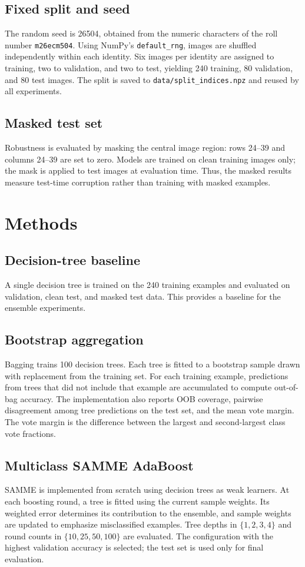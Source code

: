 \documentclass[10pt,twocolumn,letterpaper]{article}
\begin{document}
\subsection{Fixed split and seed}
The random seed is 26504, obtained from the numeric characters of the roll number \texttt{m26ecm504}. Using NumPy's \texttt{default\_rng}, images are shuffled independently within each identity. Six images per identity are assigned to training, two to validation, and two to test, yielding 240 training, 80 validation, and 80 test images. The split is saved to \texttt{data/split\_indices.npz} and reused by all experiments.

\subsection{Masked test set}
Robustness is evaluated by masking the central image region: rows 24--39 and columns 24--39 are set to zero. Models are trained on clean training images only; the mask is applied to test images at evaluation time. Thus, the masked results measure test-time corruption rather than training with masked examples.

\section{Methods}
\subsection{Decision-tree baseline}
A single decision tree is trained on the 240 training examples and evaluated on validation, clean test, and masked test data. This provides a baseline for the ensemble experiments.

\subsection{Bootstrap aggregation}
Bagging trains 100 decision trees. Each tree is fitted to a bootstrap sample drawn with replacement from the training set. For each training example, predictions from trees that did not include that example are accumulated to compute out-of-bag accuracy. The implementation also reports OOB coverage, pairwise disagreement among tree predictions on the test set, and the mean vote margin. The vote margin is the difference between the largest and second-largest class vote fractions.

\subsection{Multiclass SAMME AdaBoost}
SAMME is implemented from scratch using decision trees as weak learners. At each boosting round, a tree is fitted using the current sample weights. Its weighted error determines its contribution to the ensemble, and sample weights are updated to emphasize misclassified examples. Tree depths in $\{1,2,3,4\}$ and round counts in $\{10,25,50,100\}$ are evaluated. The configuration with the highest validation accuracy is selected; the test set is used only for final evaluation.
\end{document}
